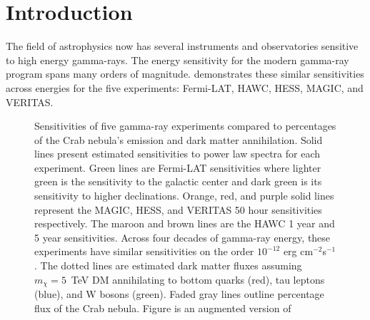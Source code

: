 \section{Introduction} \label{sec:gd_intro}

The field of astrophysics now has several instruments and observatories sensitive to high energy gamma-rays.
The energy sensitivity for the modern gamma-ray program spans many orders of magnitude.
 demonstrates these similar sensitivities across energies for the five experiments: Fermi-LAT, HAWC, HESS, MAGIC, and VERITAS.

\begin{figure}[t]
    \caption{Sensitivities of five gamma-ray experiments compared to percentages of the Crab nebula's emission and dark matter annihilation. Solid lines present estimated sensitivities to power law spectra \fu for each experiment. Green lines are Fermi-LAT sensitivities where lighter green is the sensitivity to the galactic center and dark green is its sensitivity to higher declinations. Orange, red, and purple solid lines represent the MAGIC, HESS, and VERITAS 50 hour sensitivities respectively. The maroon and brown lines are the HAWC 1 year and 5 year sensitivities. Across four decades of gamma-ray energy, these experiments have similar sensitivities on the order $10^{-12}$ erg cm$^{-2}$s$^{-1}$. The dotted lines are estimated dark matter fluxes assuming $m_{\chi} = 5$~TeV DM annihilating to bottom quarks (red), tau leptons (blue), and W bosons (green). Faded gray lines outline percentage flux of the Crab nebula. Figure is an augmented version of \cite{2020Galax...8...25R}}
    \label{fig:gd_motivation}
\end{figure}

